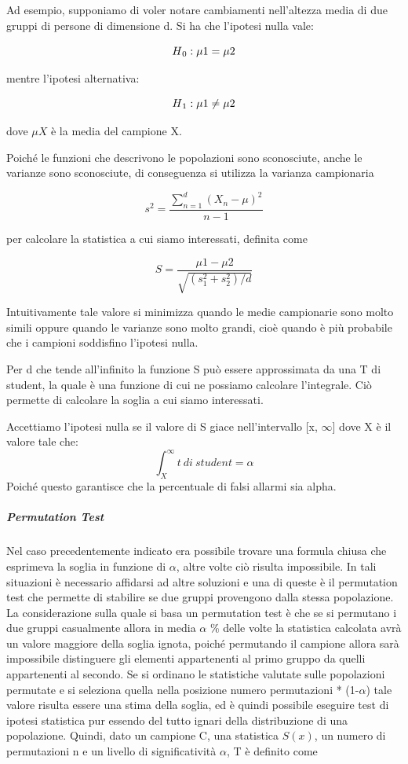 Ad esempio, supponiamo di voler notare cambiamenti nell'altezza media di due gruppi di persone di dimensione d. Si ha che l'ipotesi nulla vale:

$$ H\textsubscript{0}: \mu 1 = \mu 2 $$

mentre l'ipotesi alternativa:

$$ H\textsubscript{1}: \mu 1 \neq \mu 2 $$

dove $\mu X$ è la media del campione X.

Poiché le funzioni che descrivono le popolazioni sono sconosciute, anche le varianze sono sconosciute, di conseguenza si utilizza la varianza campionaria

$$ s^2 = {\frac{\sum_{n=1}^{d} (X_n - \mu)^2}{n-1}} $$

per calcolare la statistica a cui siamo interessati, definita come

$$ S = \frac{\mu 1 - \mu 2}{\sqrt{(s^2_1 + s^2_2) / d}} $$

Intuitivamente tale valore si minimizza quando le medie campionarie sono molto simili oppure quando le varianze sono molto grandi, cioè quando è più probabile che i campioni soddisfino l'ipotesi nulla.

Per d che tende all'infinito la funzione S può essere approssimata da una T di student, la quale è una funzione di cui ne possiamo calcolare l'integrale. Ciò permette di calcolare la soglia a cui siamo interessati.

Accettiamo l'ipotesi nulla se il valore di S giace nell'intervallo [x, $\infty$] dove X è il valore tale che:
$$ \int_{X}^{\infty} t\ di\ student = \alpha $$
Poiché questo garantisce che la percentuale di falsi allarmi sia alpha.



\subparagraph{Permutation Test}
Nel caso precedentemente indicato era possibile trovare una formula chiusa che esprimeva la soglia in funzione di $\alpha$, altre volte ciò risulta impossibile. In tali situazioni è necessario affidarsi ad altre soluzioni e una di queste è il permutation test che permette di stabilire se due gruppi provengono dalla stessa popolazione. La considerazione sulla quale si basa un permutation test è che se si permutano i due gruppi casualmente allora in media $\alpha$ \% delle volte la statistica calcolata avrà un valore maggiore della soglia ignota, poiché permutando il campione allora sarà impossibile distinguere gli elementi appartenenti al primo gruppo da quelli appartenenti al secondo. 
Se si ordinano le statistiche valutate sulle popolazioni permutate e si seleziona quella nella posizione numero permutazioni * (1-$\alpha$) tale valore risulta essere una stima della soglia, ed è quindi possibile eseguire test di ipotesi statistica pur essendo del tutto ignari della distribuzione di una popolazione.
Quindi, dato un campione C, una statistica $S(x)$, un numero di permutazioni n e un livello di significatività $\alpha$, T è definito come 

